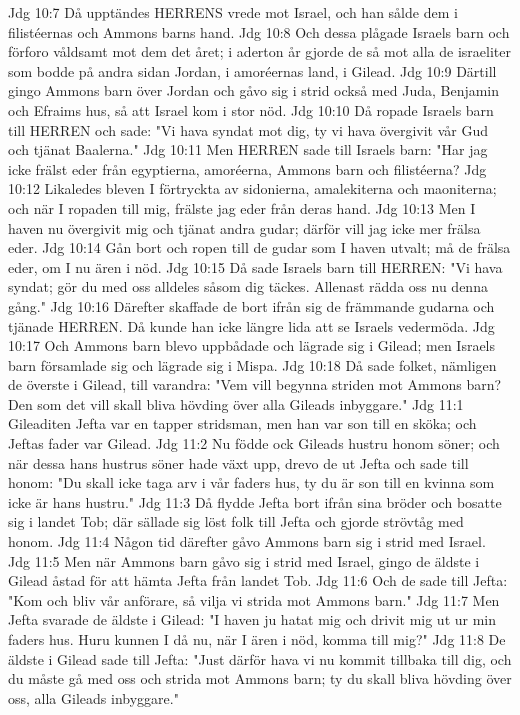 Jdg 10:7  Då upptändes HERRENS vrede mot Israel, och han sålde dem i filistéernas och Ammons barns hand.
Jdg 10:8  Och dessa plågade Israels barn och förforo våldsamt mot dem det året; i aderton år gjorde de så mot alla de israeliter som bodde på andra sidan Jordan, i amoréernas land, i Gilead.
Jdg 10:9  Därtill gingo Ammons barn över Jordan och gåvo sig i strid också med Juda, Benjamin och Efraims hus, så att Israel kom i stor nöd.
Jdg 10:10  Då ropade Israels barn till HERREN och sade: "Vi hava syndat mot dig, ty vi hava övergivit vår Gud och tjänat Baalerna."
Jdg 10:11  Men HERREN sade till Israels barn: "Har jag icke frälst eder från egyptierna, amoréerna, Ammons barn och filistéerna?
Jdg 10:12  Likaledes bleven I förtryckta av sidonierna, amalekiterna och maoniterna; och när I ropaden till mig, frälste jag eder från deras hand.
Jdg 10:13  Men I haven nu övergivit mig och tjänat andra gudar; därför vill jag icke mer frälsa eder.
Jdg 10:14  Gån bort och ropen till de gudar som I haven utvalt; må de frälsa eder, om I nu ären i nöd.
Jdg 10:15  Då sade Israels barn till HERREN: "Vi hava syndat; gör du med oss alldeles såsom dig täckes. Allenast rädda oss nu denna gång."
Jdg 10:16  Därefter skaffade de bort ifrån sig de främmande gudarna och tjänade HERREN. Då kunde han icke längre lida att se Israels vedermöda.
Jdg 10:17  Och Ammons barn blevo uppbådade och lägrade sig i Gilead; men Israels barn församlade sig och lägrade sig i Mispa.
Jdg 10:18  Då sade folket, nämligen de överste i Gilead, till varandra: "Vem vill begynna striden mot Ammons barn? Den som det vill skall bliva hövding över alla Gileads inbyggare."
Jdg 11:1  Gileaditen Jefta var en tapper stridsman, men han var son till en sköka; och Jeftas fader var Gilead.
Jdg 11:2  Nu födde ock Gileads hustru honom söner; och när dessa hans hustrus söner hade växt upp, drevo de ut Jefta och sade till honom: "Du skall icke taga arv i vår faders hus, ty du är son till en kvinna som icke är hans hustru."
Jdg 11:3  Då flydde Jefta bort ifrån sina bröder och bosatte sig i landet Tob; där sällade sig löst folk till Jefta och gjorde strövtåg med honom.
Jdg 11:4  Någon tid därefter gåvo Ammons barn sig i strid med Israel.
Jdg 11:5  Men när Ammons barn gåvo sig i strid med Israel, gingo de äldste i Gilead åstad för att hämta Jefta från landet Tob.
Jdg 11:6  Och de sade till Jefta: "Kom och bliv vår anförare, så vilja vi strida mot Ammons barn."
Jdg 11:7  Men Jefta svarade de äldste i Gilead: "I haven ju hatat mig och drivit mig ut ur min faders hus. Huru kunnen I då nu, när I ären i nöd, komma till mig?"
Jdg 11:8  De äldste i Gilead sade till Jefta: "Just därför hava vi nu kommit tillbaka till dig, och du måste gå med oss och strida mot Ammons barn; ty du skall bliva hövding över oss, alla Gileads inbyggare."
